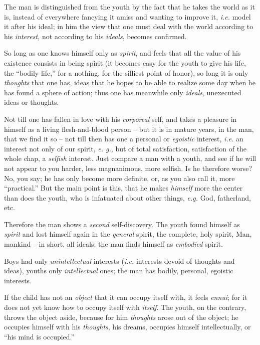 \documentclass[12pt,a4paper]{book}
\begin{document}
The man is distinguished from the youth by the fact that he takes the world as 
it is, instead of everywhere fancying it amiss and wanting to improve it, 
\textit{i.e.} model it after his ideal; in him the view that one must deal 
with the world according to his \textit{interest,} not according to his 
\textit{ideals}, becomes confirmed.

So long as one knows himself only as \textit{spirit}, and feels that all the 
value of his existence consists in being spirit (it becomes easy for the youth 
to give his life, the ``bodily life,'' for a nothing, for the silliest point 
of honor), so long it is only \textit{thoughts} that one has, ideas that he 
hopes to be able to realize some day when he has found a sphere of action; 
thus one has meanwhile only \textit{ideals}, unexecuted ideas or thoughts.

Not till one has fallen in love with his \textit{corporeal} self, and takes a 
pleasure in himself as a living flesh-and-blood person -- but it is in mature 
years, in the man, that we find it so -- not till then has one a personal or 
\textit{egoistic} interest, \textit{i.e.} an interest not only of our spirit, 
\textit{e. g.}, but of total satisfaction, satisfaction of the whole chap, a 
\textit{selfish} interest. Just compare a man with a youth, and see if he will 
not appear to you harder, less magnanimous, more selfish. Is he therefore 
worse? No, you say; he has only become more definite, or, as you also call it, 
more ``practical.'' But the main point is this, that he makes 
\textit{himself} more the center than does the youth, who is infatuated about 
other things, \textit{e.g.} God, fatherland, etc.

Therefore the man shows a \textit{second} self-discovery. The youth found 
himself as \textit{spirit} and lost himself again in the \textit{general} 
spirit, the complete, holy spirit, Man, mankind -- in short, all ideals; the 
man finds himself as \textit{embodied} spirit.

Boys had only \textit{unintellectual} interests (\textit{i.e.} interests 
devoid of thoughts and ideas), youths only \textit{intellectual} ones; the man 
has bodily, personal, egoistic interests.

If the child has not an \textit{object} that it can occupy itself with, it 
feels \textit{ennui}; for it does not yet know how to occupy itself with 
\textit{itself}. The youth, on the contrary, throws the object aside, because 
for him \textit{thoughts} arose out of the object; he occupies himself with 
his \textit{thoughts}, his dreams, occupies himself intellectually, or ``his 
mind is occupied.''
\end{document}

